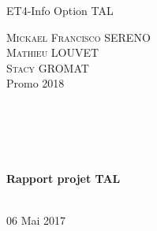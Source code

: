 \begin{titlepage}
	\begin{minipage}[t]{0.3\textwidth}
		\begin{flushleft}
		\hspace{0.1cm}ET4-Info Option TAL\\
		\end{flushleft}
	\end{minipage}\hfill
	\begin{minipage}[t]{0.6\textwidth}
		\begin{flushright}
			\textsc{Mickael Francisco SERENO} \\
			\textsc{Mathieu LOUVET} \\
			\textsc{Stacy GROMAT} \\
			Promo 2018
		\end{flushright}
	\end{minipage} ~\\[1cm]

	\begin{minipage}[t]{0.5\textwidth}
		\begin{flushleft}
		\end{flushleft}
	\end{minipage}\hfill
	\begin{minipage}[t]{0.4\textwidth}
		\begin{flushright}
		\end{flushright}
	\end{minipage}\hfill
	~\\[1cm]
	\begin{center}
	 \end{center}
	 \begin{center}
	 \HRule \\[0.4cm]
		{ \huge \bfseries Rapport projet TAL \\[0.4cm] }
		\HRule \\[1cm]
	 \end{center}
		\begin{center}
		
	 \end{center}
	\vfill
	\begin{center}
		06 Mai 2017
	\end{center}
\end{titlepage}